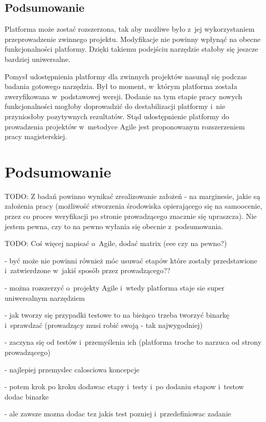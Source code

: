 \subsection{Podsumowanie}

Platforma może zostać rozszerzona, tak aby możliwe było z~jej wykorzystaniem przeprowadzenie zwinnego projektu.
Modyfikacje nie powinny wpłynąć na obecne funkcjonalności platformy.
Dzięki takiemu podejściu narzędzie stałoby się jeszcze bardziej uniwersalne.

Pomysł udostępnienia platformy dla zwinnych projektów nasunął się podczas badania gotowego narzędzia.
Był to moment, w~którym platforma została zweryfikowana w~podstawowej wersji.
Dodanie na tym etapie pracy nowych funkcjonalności mogłoby doprowadzić do destabilizacji platformy i~nie przyniosłoby pozytywnych rezultatów.
Stąd udostępnienie platformy do prowadzenia projektów w~metodyce Agile jest proponowanym rozszerzeniem pracy magisterskiej.


\section{Podsumowanie}
\label{research_summary}

TODO:
Z badań powinno wynikać zrealizowanie założeń -
na marginesie, jakie są założenia pracy (możliwość stworzenia środowiska opierającego się na samoocenie, przez co proces weryfikacji po stronie prowadzącego znacznie się upraszcza).
Nie jestem pewna, czy to na pewno wyłania się obecnie z~podsumowania.

TODO: Coś więcej napisać o~Agile, dodać matrix (eee czy na pewno?)

- być może nie powinni również móc usuwać etapów które zostały przedstawione i~zatwierdzone w~jakiś sposób przez prowadzącego??

- można rozszerzyć o~projekty Agile i~wtedy platforma staje sie super uniwersalnym narzędziem

- jak tworzy się przypadki testowe to na bieżąco trzeba tworzyć binarkę i~sprawdzać (prowadzący musi robić swoją - tak najwygodniej)

- zaczyna się od testów i~przemyślenia ich (platforma troche to narzuca od strony prowadzącego)

- najlepiej przemyslec calosciowa koncepcje

- potem krok po kroku dodawac etapy i~testy i~po dodaniu etapow i~testow dodac binarke

- ale zawsze mozna dodac tez jakis test pozniej i~przedefiniowac zadanie

